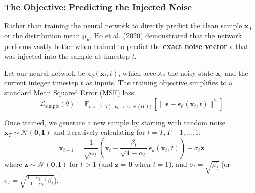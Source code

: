 \subsubsection{The Objective: Predicting the Injected Noise}
Rather than training the neural network to directly predict the clean sample $\mathbf{x}_0$ or the distribution mean $\boldsymbol{\mu}_\theta$, Ho et al. (2020) demonstrated that the network performs vastly better when trained to predict the \textbf{exact noise vector $\boldsymbol{\epsilon}$} that was injected into the sample at timestep $t$.

Let our neural network be $\boldsymbol{\epsilon}_\theta(\mathbf{x}_t, t)$, which accepts the noisy state $\mathbf{x}_t$ and the current integer timestep $t$ as inputs. The training objective simplifies to a standard Mean Squared Error (MSE) loss:
\begin{equation}
\mathcal{L}_{\text{simple}}(\theta) = \mathbb{E}_{t \sim [1, T],\, \mathbf{x}_0,\, \boldsymbol{\epsilon} \sim \mathcal{N}(\mathbf{0}, \mathbf{I})}\left[ \|\boldsymbol{\epsilon} - \boldsymbol{\epsilon}_\theta(\mathbf{x}_t, t)\|^2 \right]\label{eq:diffusion_loss}
\end{equation}

Once trained, we generate a new sample by starting with random noise $\mathbf{x}_T \sim \mathcal{N}(\mathbf{0}, \mathbf{I})$ and iteratively calculating for $t = T, T-1, \dots, 1$:
\begin{equation}
\mathbf{x}_{t-1} = \frac{1}{\sqrt{\alpha_t}}\left(\mathbf{x}_t - \frac{\beta_t}{\sqrt{1 - \bar{\alpha}_t}}\,\boldsymbol{\epsilon}_\theta(\mathbf{x}_t, t)\right) + \sigma_t \mathbf{z}\label{eq:reverse_sampling_step}
\end{equation}
where $\mathbf{z} \sim \mathcal{N}(\mathbf{0}, \mathbf{I})$ for $t > 1$ (and $\mathbf{z} = \mathbf{0}$ when $t = 1$), and $\sigma_t = \sqrt{\beta_t}$ (or $\sigma_t = \sqrt{\frac{1 - \bar{\alpha}_{t-1}}{1 - \bar{\alpha}_t}\beta_t}$).

